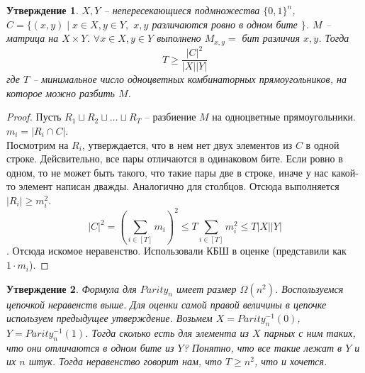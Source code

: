 \documentclass[12pt, letterpaper]{article}
\newtheorem{prop}{Утверждение}[section]
\begin{document}
\begin{prop}
$X,Y$ -- непересекающиеся подмножества $\{0, 1\}^n$, $C = \{(x,y)\;|\;x\in X, y\in Y,$ $x,y$ различаются ровно в одном бите $\}$. $M$ -- матрица на $X \times Y$. $\forall x \in X, y \in Y$ выполнено $M_{x,y} = $ бит различия $x, y$. Тогда $$T \geq \frac{|C|^2}{|X||Y|}$$ где $T$ -- минимальное число одноцветных комбинаторных прямоугольников, на которое можно разбить $M$.
\end{prop}
\begin{proof}
Пусть $R_1 \sqcup R_2 \sqcup \ldots \sqcup R_{T}$ -- разбиение $M$ на одноцветные прямоугольники. $m_i = |R_i \cap C|$. \\
Посмотрим на $R_i$, утверждается, что в нем нет двух элементов из $C$ в одной строке. Дейсвительно, все пары отличаются в одинаковом бите. Если ровно в одном, то не может быть такого, что такие пары две в строке, иначе у нас какой-то элемент написан дважды. Аналогично для столбцов. Отсюда выполняется $|R_i| \geq m_i^2$.
$$|C|^2 = (\sum_{i \in [T]} m_i)^2 \leq T \sum_{i \in [T]} m_i^2 \leq T |X| |Y| $$. Отсюда искомое неравенство. Использовали КБШ в оценке (представили как $1 \cdot m_i$).
\end{proof}

\begin{prop} Формула для $Parity_n$ имеет размер $\Omega(n^2)$.
Воспользуемся цепочкой неравенств выше. Для оценки самой правой величины в цепочке используем предыдущее утверждение. Возьмем $X = Parity_n^{-1}(0)$, $Y = Parity_n^{-1}(1)$. Тогда сколько есть для элемента из $X$ парных с ним таких, что они отличаются в одном бите из $Y$? Понятно, что все такие лежат в $Y$ и их $n$ штук. Тогда неравенство говорит нам, что $T \geq n^2$, что и хочется.
\end{prop}
\end{document}
